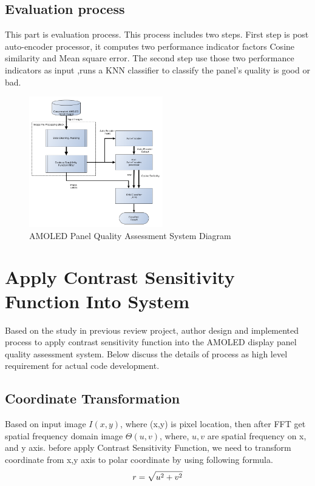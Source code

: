 \documentclass{article}
\begin{document}
\subsection{Evaluation process}
This part is evaluation process. This process includes two steps. First step is post auto-encoder processor, it computes two performance indicator factors Cosine similarity and Mean square error. The second step use those two performance indicators as input ,runs a KNN classifier to classify the panel's quality is good or bad.
\begin{figure}[h]
    \centering
    \includegraphics[width=0.52\textwidth]{images/system_diagram.png}\vfill
    \caption{AMOLED Panel Quality Assessment System Diagram}
    \label{fig_sys_diagram}
\end{figure}
\section{Apply Contrast Sensitivity Function Into System}
Based on the study in previous review project, author design and implemented process to apply contrast sensitivity function into the AMOLED display panel quality assessment system. Below discuss the details of process as high level requirement for actual code development.
\subsection{Coordinate Transformation}
Based on input image $I(x,y)$, where (x,y) is pixel location, then after FFT get spatial frequency domain image $\Theta(u,v)$, where, $u,v$ are spatial frequency on x, and y axis. before apply Contrast Sensitivity Function, we need to transform coordinate from x,y axis to polar coordinate by using following formula.
\begin{equation}
    \centering
    \label{eq:coor}
     r = \sqrt{u^2+v^2}
\end{equation}
\end{document}
